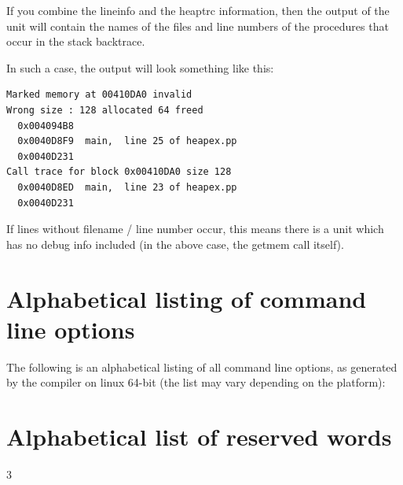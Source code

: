 If you combine the lineinfo and the heaptrc information, then the output
of the  unit will contain the names of the files and line
numbers of the procedures that occur in the stack backtrace.

In such a case, the output will look something like this:
\begin{verbatim}
Marked memory at 00410DA0 invalid
Wrong size : 128 allocated 64 freed
  0x004094B8
  0x0040D8F9  main,  line 25 of heapex.pp
  0x0040D231
Call trace for block 0x00410DA0 size 128
  0x0040D8ED  main,  line 23 of heapex.pp
  0x0040D231
\end{verbatim}
If lines without filename / line number occur, this means there is a unit which
has no debug info included (in the above case, the getmem call itself).


\appendix

\chapter{Alphabetical listing of command line options}
\label{ch:commandlineoptions}
The following is an alphabetical listing of all command line options, as
generated by the compiler on linux 64-bit (the list may vary depending on
the platform):



\chapter{Alphabetical list of reserved words}
\label{ch:reserved}
\begin{multicols}{3}

\end{multicols}


